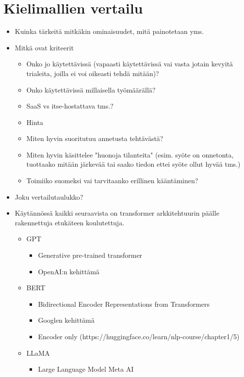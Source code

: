 \chapter{Kielimallien vertailu}%
\label{ch:vertailu}

\begin{itemize}
  \item Kuinka tärkeitä mitkäkin ominaisuudet, mitä painotetaan yms.
  \item Mitkä ovat kriteerit
  \begin{itemize}
    \item Onko jo käytettävissä (vapaasti käytettävissä vai vasta jotain kevyitä trialeita, joilla ei voi oikeasti tehdä mitään)?
    \item Onko käytettävissä millaisella työmäärällä?
    \item SaaS vs itse-hostattava tms.?
    \item Hinta
    \item Miten hyvin suoritutuu annetusta tehtävästä?
    \item Miten hyvin käsittelee "huonoja tilanteita" (esim. syöte on onnetonta, tuottaako mitään järkevää tai saako tiedon ettei syöte ollut hyvää tms.)
    \item Toimiiko suomeksi vai tarvitaanko erillinen kääntäminen?
  \end{itemize}
  \item Joku vertailutaulukko?
  \item  Käytännössä kaikki seuraavista on transformer arkkitehtuurin päälle rakennettuja etukäteen koulutettuja.
  \begin{itemize}
    \item GPT
    \begin{itemize}
      \item Generative pre-trained transformer
      \item OpenAI:n kehittämä
    \end{itemize}
    \item BERT
    \begin{itemize}
      \item Bidirectional Encoder Representations from Transformers
      \item Googlen kehittämä
      \item Encoder only (https://huggingface.co/learn/nlp-course/chapter1/5)
    \end{itemize}
    \item LLaMA
    \begin{itemize}
      \item Large Language Model Meta AI

\end{itemize}
\end{itemize}
\end{itemize}
